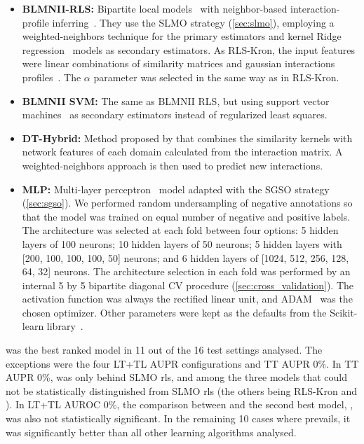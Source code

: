 \begin{itemize}
    \item \textbf{BLMNII-RLS:} Bipartite local models~\cite{yamanishi2008prediction,bleakley2009supervised} with neighbor-based interaction-profile inferring~\cite{mei2013drug}. They use the SLMO strategy (\autoref{sec:slmo}), employing a weighted-neighbors technique 
    for the primary estimators and kernel Ridge regression~\cite[p.~492-493]{murphy2012machine} models as secondary estimators.
    As RLS-Kron, the input features were linear combinations of similarity matrices and gaussian interactions profiles~\cite{vanlaarhoven2011gaussian}. The $\alpha$ parameter was selected in the same way as in RLS-Kron.

    \item \textbf{BLMNII SVM:} The same as BLMNII RLS, but using support vector machines~\cite{crammer2001algorithmic} as secondary estimators instead of regularized least squares.

    \item \textbf{DT-Hybrid:} Method proposed by  that combines the similarity kernels with network features of each domain calculated from the interaction matrix. A weighted-neighbors approach is then used to predict new interactions.  %

    \item \textbf{MLP:} Multi-layer perceptron~\cite{hastie2001elements} %
    model adapted with the SGSO strategy (\autoref{sec:sgso}). We performed random undersampling of negative annotations so that the model was trained on equal number of negative and positive labels. 
    The architecture was selected at each fold between four options: 5 hidden layers of 100 neurons; 10 hidden layers of 50 neurons; 5 hidden layers with [200, 100, 100, 100, 50] neurons; and 6 hidden layers of [1024, 512, 256, 128, 64, 32] neurons. The architecture selection in each fold was performed by an internal 5 by 5 bipartite diagonal CV procedure (\autoref{sec:cross_validation}).
    The activation function was always the rectified linear unit, and ADAM~\cite{kingma2017adam} was the chosen optimizer. Other parameters were kept as the defaults from the Scikit-learn library~\cite{pedregosa2011scikitlearn}.
\end{itemize}

 was the best ranked model in 11 out of the 16 test settings analysed. The exceptions were the four LT+TL AUPR configurations and TT AUPR 0\%. In TT AUPR 0\%,  was only behind SLMO rls, and among the three models that could not be statistically distinguished from SLMO rls (the others being RLS-Kron and ). In LT+TL AUROC 0\%, the comparison between  and the second best model, , was also not statistically significant. In the remaining 10 cases where  prevails, it was significantly better than all other learning algorithms analysed.


